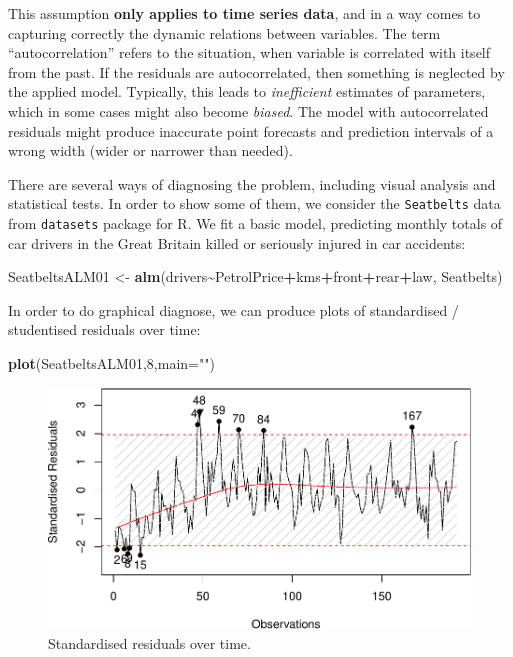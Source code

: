 \documentclass[
]{book}
\newenvironment{Shaded}{\begin{snugshade}}{\end{snugshade}}
\newcommand{\AttributeTok}[1]{\textcolor[rgb]{0.13,0.29,0.53}{#1}}
\newcommand{\DecValTok}[1]{\textcolor[rgb]{0.00,0.00,0.81}{#1}}
\newcommand{\FunctionTok}[1]{\textcolor[rgb]{0.13,0.29,0.53}{\textbf{#1}}}
\newcommand{\NormalTok}[1]{#1}
\newcommand{\OtherTok}[1]{\textcolor[rgb]{0.56,0.35,0.01}{#1}}
\newcommand{\SpecialCharTok}[1]{\textcolor[rgb]{0.81,0.36,0.00}{\textbf{#1}}}
\newcommand{\StringTok}[1]{\textcolor[rgb]{0.31,0.60,0.02}{#1}}
\theoremstyle{definition}
\theoremstyle{definition}
\theoremstyle{definition}
\theoremstyle{definition}
\theoremstyle{remark}
\begin{document}
This assumption \textbf{only applies to time series data}, and in a way comes to capturing correctly the dynamic relations between variables. The term ``autocorrelation'' refers to the situation, when variable is correlated with itself from the past. If the residuals are autocorrelated, then something is neglected by the applied model. Typically, this leads to \emph{inefficient} estimates of parameters, which in some cases might also become \emph{biased}. The model with autocorrelated residuals might produce inaccurate point forecasts and prediction intervals of a wrong width (wider or narrower than needed).

There are several ways of diagnosing the problem, including visual analysis and statistical tests. In order to show some of them, we consider the \texttt{Seatbelts} data from \texttt{datasets} package for R. We fit a basic model, predicting monthly totals of car drivers in the Great Britain killed or seriously injured in car accidents:

\begin{Shaded}
\begin{Highlighting}[]
\NormalTok{SeatbeltsALM01 }\OtherTok{\textless{}{-}} \FunctionTok{alm}\NormalTok{(drivers}\SpecialCharTok{\textasciitilde{}}\NormalTok{PetrolPrice}\SpecialCharTok{+}\NormalTok{kms}\SpecialCharTok{+}\NormalTok{front}\SpecialCharTok{+}\NormalTok{rear}\SpecialCharTok{+}\NormalTok{law, Seatbelts)}
\end{Highlighting}
\end{Shaded}

In order to do graphical diagnose, we can produce plots of standardised / studentised residuals over time:

\begin{Shaded}
\begin{Highlighting}[]
\FunctionTok{plot}\NormalTok{(SeatbeltsALM01,}\DecValTok{8}\NormalTok{,}\AttributeTok{main=}\StringTok{""}\NormalTok{)}
\end{Highlighting}
\end{Shaded}

\begin{figure}
\centering
\includegraphics{Svetunkov---Statistics-for-Business-Analytics_files/figure-latex/diagnostics08-1.pdf}
\caption{\label{fig:diagnostics08}Standardised residuals over time.}
\end{figure}
\end{document}
